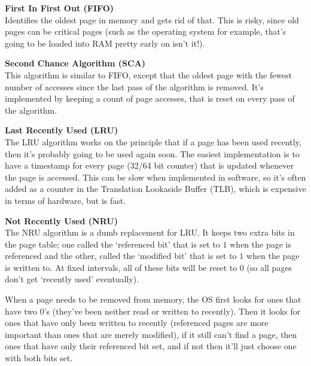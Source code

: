 \begin{description}
  \item \textbf{First In First Out (FIFO)}\\
    Identifies the oldest page in memory and gets rid of that. This is risky,
    since old pages can be critical pages (such as the operating system for
    example, that's going to be loaded into RAM pretty early on isn't it!).

  \item \textbf{Second Chance Algorithm (SCA)}\\
    This algorithm is similar to FIFO, except that the oldest page with the
    fewest number of accesses since the last pass of the algorithm is removed.
    It's implemented by keeping a count of page accesses, that is reset on every
    pass of the algorithm.

  \item \textbf{Last Recently Used (LRU)}\\
    The LRU algorithm works on the principle that if a page has been used
    recently, then it's probably going to be used again soon. The easiest
    implementation is to have a timestamp for every page (32/64 bit counter)
    that is updated whenever the page is accessed. This can be slow when
    implemented in software, so it's often added as a counter in the Translation
    Lookaside Buffer (TLB), which is
    expensive in terms of hardware, but is fast.

  \item \textbf{Not Recently Used (NRU)}\\

    The NRU algorithm is a dumb replacement for LRU. It keeps two extra bits in
    the page table; one called the `referenced bit' that is set to $1$ when the
    page is referenced and the other, called the `modified bit' that is set to
    $1$ when the page is written to. At fixed intervals, all of these bits will
    be reset to $0$ (so all pages don't get `recently used' eventually).

    When a page needs to be removed from memory, the OS first looks for ones
    that have two $0$'s (they've been neither read or written to recently). Then
    it looks for ones that have only been written to recently (referenced pages
    are more important than ones that are merely modified), if it still can't
    find a page, then ones that have only their referenced bit set, and if not
    then it'll just choose one with both bits set.
\end{description}


